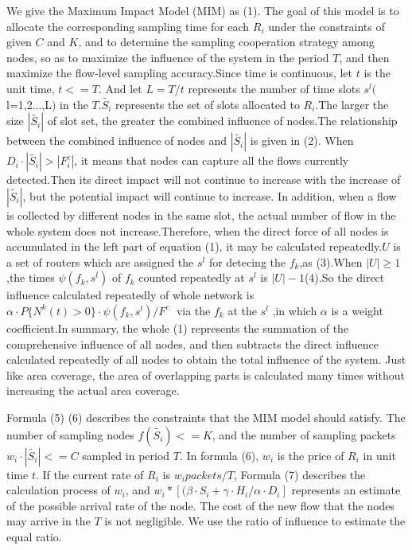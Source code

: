 \documentclass[conference,compsoc]{IEEEtran}
\begin{document}
We give the Maximum Impact Model (MIM) as (1). The goal of this model is to allocate the corresponding sampling time for each $R_i$ under the constraints of given $C$ and $K$, and to determine the sampling cooperation strategy among nodes, so as to maximize the influence of the system in the period $T$, and then maximize the flow-level sampling accuracy.Since time is continuous, let $t$ is the unit time, $t<=T$. And let $L = T/t$ represents the number of time slots ${{s}^{l}}($l=1,2...,L$)$ in the $T$.$\widetilde{{{S}_{i}}}$ represents the set of slots allocated to $R_i$.The larger the size $|\widetilde{{{S}_{i}}}|$ of slot set, the greater the combined influence of nodes.The relationship between the combined influence of nodes and $|\widetilde{{{S}_{i}}}|$ is given in (2). When $ D_i\cdot |\widetilde{{{S}_{i}}}|>|F^c_i|$, it means that nodes can capture all the flows currently detected.Then its direct impact will not continue to increase with the increase of $|\widetilde{{{S}_{i}}}|$, but the potential impact will continue to increase. In addition, when a flow is collected by different nodes in the same slot, the actual number of flow in the whole system does not increase.Therefore, when the direct force of all nodes is accumulated in the left part of equation (1), it may be calculated repeatedly.$U$ is a set of routers which are assigned the ${{s}^{l}}$ for detecing the $f_k$,as (3).When $|U|\ge 1$,the times $\psi ({{f}_{k}},{{s}^{l}})$ of $f_k$ counted repeatedly at ${{s}^{l}}$ is $|U|-1$(4).So the direct influence calculated repeatedly of whole network is ${\alpha \cdot P\{{{N}^{k}}(t)>0\}\cdot \psi ({{f}_{k}},{{s}^{l}})}/{{{F}^{c}}}\;$ via the $f_k$ at the ${{s}^{l}}$ ,in which $\alpha$ is a weight coefficient.In summary, the whole (1) represents the summation of the comprehensive influence of all nodes, and then subtracts the direct influence calculated repeatedly of all nodes to obtain the total influence of the system. Just like area coverage, the area of overlapping parts is calculated many times without increasing the actual area coverage.

Formula (5) (6) describes the constraints that the MIM model should satisfy. The number of sampling nodes $f(\widetilde{{{S}_{i}}})<= K$, and the number of sampling packets $w_i \cdot |\widetilde{{{S}_{i}}}|<=C$ sampled in period $T$. In formula (6), $w_i$ is the price of $R_i$ in unit time $t$. If the current rate of $R_i$ is $w_i packets/T$, Formula (7) describes the calculation process of $w_i$, and $w_i*[(\beta \cdot {S_i}+ \gamma \cdot {H_i}/\alpha \cdot {D_i}]$ represents an estimate of the possible arrival rate of the node. The cost of the new flow that the nodes may arrive in the $T$ is not negligible. We use the ratio of influence to estimate the equal ratio.
\end{document}
